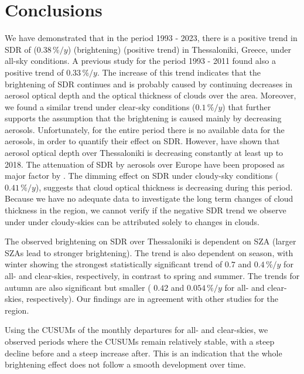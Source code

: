\documentclass[applsci,article,submit,moreauthors,pdftex]{Definitions/mdpi}
\begin{document}
\hypertarget{conclusions}{%
\section{Conclusions}\label{conclusions}}

We have demonstrated that in the period 1993 - 2023, there is a positive
trend in SDR of (\(0.38\,\%/y\)) (brightening) (positive trend) in
Thessaloniki, Greece, under all-sky conditions. A previous study
\citep{Bais2013} for the period 1993 - 2011 found also a positive trend
of \(0.33\,\%/y\). The increase of this trend indicates that the
brightening of SDR continues and is probably caused by continuing
decreases in aerosol optical depth and the optical thickness of clouds
over the area. Moreover, we found a similar trend under clear-sky
conditions (\(0.1\,\%/y\)) that further supports the assumption that the
brightening is caused mainly by decreasing aerosols. Unfortunately, for
the entire period there is no available data for the aerosols, in order
to quantify their effect on SDR. However, \citet{Siomos2020} have shown
that aerosol optical depth over Thessaloniki is decreasing constantly at
least up to 2018. The attenuation of SDR by aerosols over Europe have
been proposed as major factor by \citet{Wild2021}. The dimming effect on
SDR under cloudy-sky conditions (\(0.41\,\%/y\)), suggests that cloud
optical thickness is decreasing during this period. Because we have no
adequate data to investigate the long term changes of cloud thickness in
the region, we cannot verify if the negative SDR trend we observe under
under cloudy-skies can be attributed solely to changes in clouds.

The observed brightening on SDR over Thessaloniki is dependent on SZA
(larger SZAs lead to stronger brightening). The trend is also dependent
on season, with winter showing the strongest statistically significant
trend of \(0.7\) and \(0.4\,\%/y\) for all- and clear-skies,
respectively, in contrast to spring and summer. The trends for autumn
are also significant but smaller ( \(0.42\) and \(0.054\,\%/y\) for all-
and clear-skies, respectively). Our findings are in agreement with other
studies for the region.

Using the CUSUMs of the monthly departures for all- and clear-skies, we
observed periods where the CUSUMs remain relatively stable, with a steep
decline before and a steep increase after. This is an indication that
the whole brightening effect does not follow a smooth development over
time.
\end{document}
